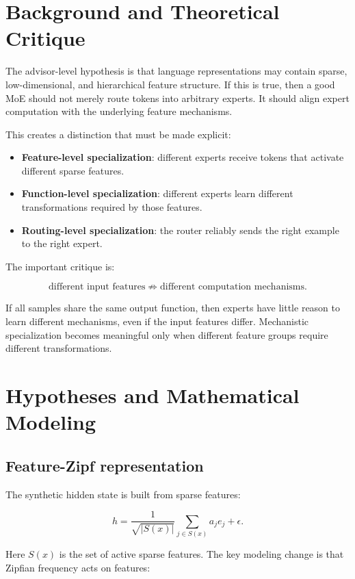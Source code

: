 \documentclass[11pt]{article}
\begin{document}
\section{Background and Theoretical Critique}

The advisor-level hypothesis is that language representations may contain sparse, low-dimensional, and hierarchical feature structure. If this is true, then a good MoE should not merely route tokens into arbitrary experts. It should align expert computation with the underlying feature mechanisms.

This creates a distinction that must be made explicit:

\begin{itemize}[leftmargin=1.5em]
    \item \textbf{Feature-level specialization}: different experts receive tokens that activate different sparse features.
    \item \textbf{Function-level specialization}: different experts learn different transformations required by those features.
    \item \textbf{Routing-level specialization}: the router reliably sends the right example to the right expert.
\end{itemize}

The important critique is:

$$
\text{different input features}
\not\Rightarrow
\text{different computation mechanisms}.
$$

If all samples share the same output function, then experts have little reason to learn different mechanisms, even if the input features differ. Mechanistic specialization becomes meaningful only when different feature groups require different transformations.

\section{Hypotheses and Mathematical Modeling}

\subsection{Feature-Zipf representation}

The synthetic hidden state is built from sparse features:

$$
h=\frac{1}{\sqrt{|S(x)|}}\sum_{j\in S(x)}a_je_j+\epsilon.
$$

Here $S(x)$ is the set of active sparse features. The key modeling change is that Zipfian frequency acts on features:
\end{document}
